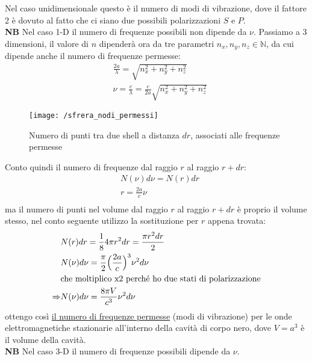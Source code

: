 \begin{enumerate}[label=\Roman{*}.]
Nel caso unidimensionale questo è il numero di modi di vibrazione, dove il fattore 2 è dovuto al fatto che ci siano due possibili polarizzazioni $S$ e $P$. \\
\textbf{NB} Nel caso 1-D il numero di frequenze possibili non dipende da $\nu$.
Passiamo a 3 dimensioni, il valore di $n$ dipenderà ora da tre parametri $n_x, n_y, n_z \in \mathbb{N}$, da cui dipende anche il numero di frequenze permesse:
\begin{equation}
\begin{split}
& \frac{2a}{\lambda} = \sqrt{n_x^2 + n_y^2 + n_z^2} \\
& \nu = \frac{ c}{\lambda } = \frac{ c}{2a } \sqrt{n_x^2 + n_y^2 + n_z^2}
\end{split}
\end{equation}
\begin{figure}[h]
\centering
\texttt{[image: /sfrera\_nodi\_permessi]}
\caption{Numero di punti tra due shell a distanza $dr$, associati alle frequenze permesse}
\end{figure}
Conto quindi il numero di frequenze dal raggio $r$ al raggio $r + dr$:
\begin{equation}
\begin{split}
& N(\nu) d\nu = N(r)dr \\ 
& r = \frac{2a}{c}\nu \\
\end{split}
\end{equation}
ma il numero di punti nel volume dal raggio $r$ al raggio $r + dr$ è proprio il volume stesso, nel conto seguente utilizzo la sostituzione per $r$ appena trovata:
\begin{equation}
\begin{split}
& N(r) dr = \frac{ 1}{8 } 4 \pi r^2 dr = \frac{ \pi r^2 dr}{2 } \\
& N(\nu)d\nu = \frac{ \pi}{2 } \Bigl(  \frac{ 2a}{c }  \Bigr)^3 \nu^2 d\nu \\
& \mbox{che moltiplico x2 perché ho due stati di polarizzazione} \\
\Rightarrow & N(\nu) d\nu = \frac{ 8\pi V}{c^3 } \nu^2 d\nu
\end{split}
\end{equation}
ottengo così \underline{il numero di frequenze permesse} (modi di vibrazione) per le onde elettromagnetiche stazionarie all'interno della cavità di corpo nero, dove $V=a^3$ è il volume della cavità. \\
\textbf{NB} Nel caso 3-D il numero di frequenze possibili dipende da $\nu$.

\end{enumerate}

